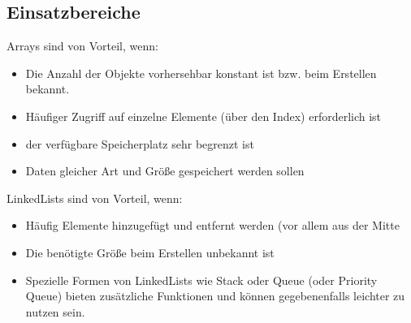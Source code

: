 \documentclass[12pt]{amsart}
\begin{document}
\subsection*{Einsatzbereiche} 
\newline
Arrays sind von Vorteil, wenn:
\begin{itemize}
\item Die Anzahl der Objekte vorhersehbar konstant ist bzw. beim Erstellen bekannt.
\item Häufiger Zugriff auf einzelne Elemente (über den Index) erforderlich ist
\item der verfügbare Speicherplatz sehr begrenzt ist
\item Daten gleicher Art und Größe gespeichert werden sollen
\end{itemize}
LinkedLists sind von Vorteil, wenn:
\begin{itemize}
\item Häufig Elemente hinzugefügt und entfernt werden (vor allem aus der Mitte
\item Die benötigte Größe beim Erstellen unbekannt ist
\item Spezielle Formen von LinkedLists wie Stack oder Queue (oder Priority Queue) bieten zusätzliche Funktionen und können gegebenenfalls leichter zu nutzen sein.
\end{itemize}
\end{document}
